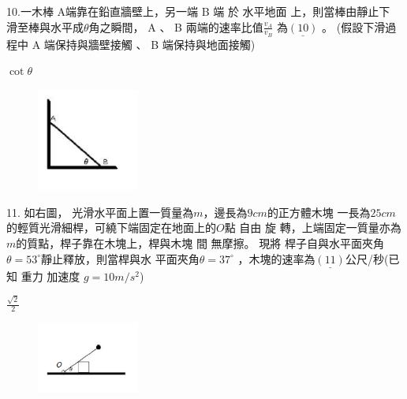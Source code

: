 \documentclass[cn,10pt,math=newtx,chinesefont=founder,device=ig]{elegantbook}
\begin{document}
\begin{example}
   10.一木棒 A端靠在鉛直牆壁上，另一端 B 端 於 水平地面 上，則當棒由靜止下
滑至棒與水平成$\theta$角之瞬間， A 、 B 兩端的速率比值$\frac{v_A}{v_B}$ 為$\underline{(10)}$ 。 (假設下滑過程中 A 端保持與牆壁接觸 、 B 端保持與地面接觸)
\\
    \rightline{[文華高中教甄109]}
\end{example}
\begin{solution}
    $\cot{\theta}$
\end{solution}
\begin{figure}[htbp]
    \flushright
    \includegraphics[width=0.3\textwidth]{image/109文華10.png}
  \end{figure}
\newpage


\begin{example}
  11.
如右圖， 光滑水平面上置一質量為$m$，邊長為$9cm$的正方體木塊
一長為$25cm$的輕質光滑細桿，可繞下端固定在地面上的$O$點 自由 旋
轉，上端固定一質量亦為$m$的質點，桿子靠在木塊上，桿與木塊 間
無摩擦。 現將 桿子自與水平面夾角$\theta=53^\circ$靜止釋放，則當桿與水
平面夾角$\theta=37^\circ$ ，木塊的速率為$\underline{(11)}$公尺/秒(已知 重力
加速度 $g=10m/s^2$) \\
    \rightline{[文華高中教甄109]}
\end{example}
\begin{solution}
    $\frac{\sqrt{2}} {2}$
\end{solution}
\begin{figure}[htbp]
    \flushright
    \includegraphics[width=0.3\textwidth]{image/109文華11.png}
  \end{figure}
\newpage
\end{document}
